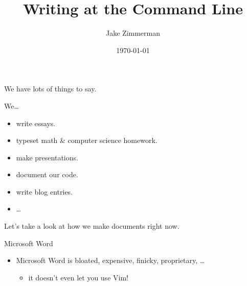 \documentclass[12pt,ignorenonframetext,]{beamer}
\title{Writing at the Command Line}
\author{Jake Zimmerman}
\date{\today}
\providecommand{\tightlist}{%
  \setlength{\itemsep}{0pt}\setlength{\parskip}{0pt}}
\begin{document}
\frame{\titlepage}

\begin{frame}{We have lots of things to say.}

We\ldots{}

\begin{itemize}
\tightlist
\item
  write essays.
\item
  typeset math \& computer science homework.
\item
  make presentations.
\item
  document our code.
\item
  write blog entries.
\item
  \ldots{}
\end{itemize}

\end{frame}

\begin{frame}{}

\Huge{Let's take a look at how we make documents right now.}

\end{frame}

\begin{frame}{Microsoft Word}

\begin{itemize}
\tightlist
\item
  Microsoft Word is bloated, expensive, finicky, proprietary, \ldots{}

  \begin{itemize}
  \tightlist
  \item
    it doesn't even let you use Vim!
  \end{itemize}
\end{itemize}

\end{frame}
\end{document}
